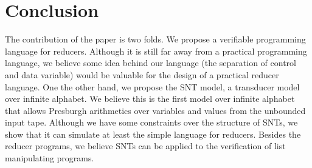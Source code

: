 	
\section{Conclusion}
\label{sec:conclusion}


The contribution of the paper is two folds. We propose a verifiable programming language for reducers. Although it is still far away from a practical programming language, we believe some idea behind our language (the separation of control and data variable) would be valuable for the design of a practical reducer language. One the other hand, we propose the SNT model, a transducer model over infinite alphabet. We believe this is the first model over infinite alphabet that allows Presburgh arithmetics over variables and values from the unbounded input tape. Although we have some constraints over the structure of SNTs, we show that it can simulate at least the simple language for reducers. Besides the reducer programs, we  believe SNTs can be applied to the verification of list manipulating programs.



